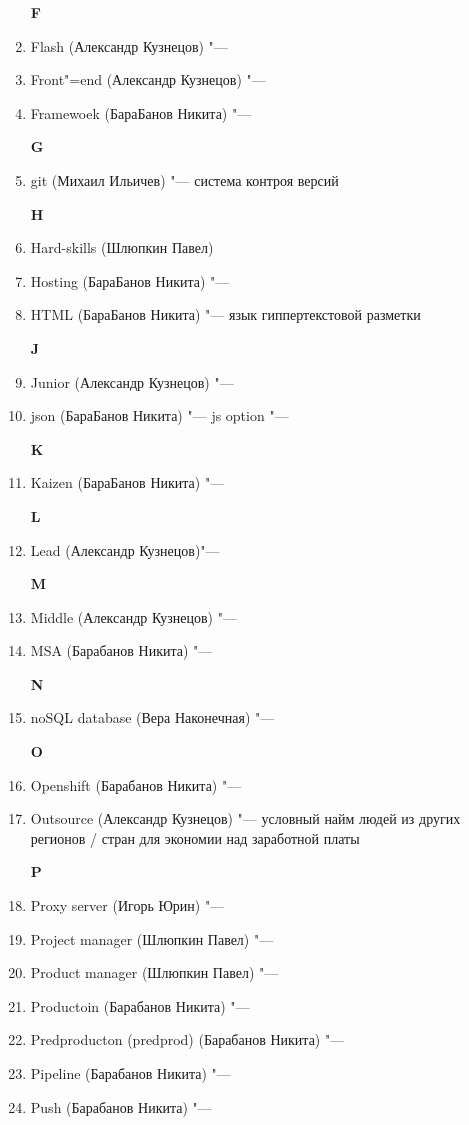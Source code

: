 \documentclass{article}
\begin{document}
\begin{enumerate}
    \textbf{F}
    \item {Flash (Александр Кузнецов) "---}
    \item {Front"=end (Александр Кузнецов) "---}
    \item {Framewoek (БараБанов Никита) "---}

    \textbf{G}
    \item {git (Михаил Ильичев) "--- система контроя версий}

    \textbf{H}
    \item {Hard-skills (Шлюпкин Павел)}
    \item {Hosting (БараБанов Никита) "---}
    \item {HTML (БараБанов Никита) "--- язык гиппертекстовой разметки}

    \textbf{J}
    \item {Junior (Александр Кузнецов) "---}
    \item {json (БараБанов Никита) "--- js option "---}

    \textbf{K}
    \item {Kaizen (БараБанов Никита) "---}

    \textbf{L}
    \item {Lead (Александр Кузнецов)"---}

    \textbf{M}
    \item {Middle (Александр Кузнецов) "---}
    \item {MSA (Барабанов Никита) "---}

    \textbf{N}
    \item {noSQL database (Вера Наконечная) "---}

    \textbf{O}
    \item {Openshift (Барабанов Никита) "---}
    \item {Outsource (Александр Кузнецов) "--- условный найм людей из других регионов / стран для экономии над заработной платы}

    \textbf{P}
    
    \item {Proxy server (Игорь Юрин) "---}
    \item {Project manager (Шлюпкин Павел) "---}
    \item {Product manager (Шлюпкин Павел) "---}
    \item {Productoin (Барабанов Никита) "---}
    \item {Predproducton (predprod) (Барабанов Никита) "---}
    \item {Pipeline (Барабанов Никита) "--- }
    \item {Push (Барабанов Никита) "---}
    

\end{enumerate}
\end{document}
